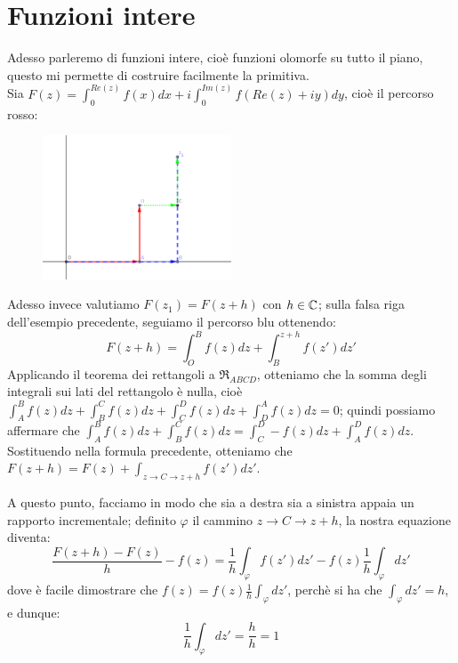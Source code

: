 \chapter{Funzioni intere}

Adesso parleremo di funzioni intere, cioè funzioni olomorfe su tutto il piano, questo mi permette di costruire facilmente la primitiva. \\ Sia $F(z)=\int_0 ^{Re(z)} f(x)dx + i \int_0 ^{Im(z)} f(Re(z)+ iy)dy$, cioè il percorso rosso:

\begin{figure}[h!]
  \centering
    \includegraphics[width=0.5\textwidth]{immagini/percorsi-integrale.png}
\end{figure}

Adesso invece valutiamo $F(z_1)=F(z+h)$ con $h \in \mathbb{C}$; sulla falsa riga dell'esempio precedente, seguiamo il percorso blu ottenendo:
$$F(z+h)=\int_O ^B f(z)dz + \int_B ^{z+h} f(z')dz'$$
Applicando il teorema dei rettangoli a $\mathfrak{R}_{ABCD}$, otteniamo che la somma degli integrali sui lati del rettangolo è nulla, cioè $\int_A ^B f(z)dz+\int_B ^C f(z)dz+\int_C ^D f(z)dz+\int_D ^A f(z)dz=0$; quindi possiamo affermare che  $\int_A ^B f(z)dz+\int_B ^C f(z)dz=\int_C ^D -f(z)dz+\int_A ^D f(z)dz$. Sostituendo nella formula precedente, otteniamo che $F(z+h)=F(z)+\int_{z \to C \to z+h} f(z')dz'$.

A questo punto, facciamo in modo che sia a destra sia a sinistra appaia un rapporto incrementale; definito $\varphi$ il cammino $z \to C \to z+h$, la nostra equazione diventa:
$$\frac{F(z+h)-F(z)}{h}-f(z)=\frac{1}{h} \int_{\varphi}f(z')dz' -  f(z)\frac{1}{h} \int_{\varphi}dz'$$
dove è facile dimostrare che $f(z)=f(z)\frac{1}{h} \int_{\varphi}dz'$, perchè si ha che $\int_{\varphi}dz'=h$, e dunque: 
$$\frac{1}{h} \int_{\varphi}dz'=\frac{h}{h}=1$$

